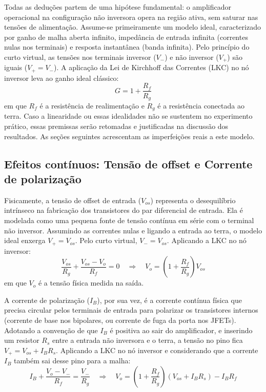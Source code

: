 \documentclass[11pt,a4paper]{article}
\begin{document}
Todas as deduções partem de uma hipótese fundamental: o amplificador operacional na configuração não inversora opera na região ativa, sem saturar nas tensões de alimentação. Assume-se primeiramente um modelo ideal, caracterizado por ganho de malha aberta infinito, impedância de entrada infinita (correntes nulas nos terminais) e resposta instantânea (banda infinita). Pelo princípio do curto virtual, as tensões nos terminais inversor ($V_-$) e não inversor ($V_+$) são iguais ($V_+ = V_-$). A aplicação da Lei de Kirchhoff das Correntes (LKC) no nó inversor leva ao ganho ideal clássico:
\begin{equation}
G = 1 + \frac{R_f}{R_g}
\label{eq:ganho_ni}
\end{equation}
em que $R_f$ é a resistência de realimentação e $R_g$ é a resistência conectada ao terra. Caso a linearidade ou essas idealidades não se sustentem no experimento prático, essas premissas serão retomadas e justificadas na discussão dos resultados. As seções seguintes acrescentam as imperfeições reais a este modelo.

\subsection{Efeitos contínuos: Tensão de offset e Corrente de polarização}

Fisicamente, a tensão de offset de entrada ($V_{os}$) representa o desequilíbrio intrínseco na fabricação dos transistores do par diferencial de entrada. Ela é modelada como uma pequena fonte de tensão contínua em série com o terminal não inversor. Assumindo as correntes nulas e ligando a entrada ao terra, o modelo ideal enxerga $V_+ = V_{os}$. Pelo curto virtual, $V_- = V_{os}$. Aplicando a LKC no nó inversor:
\begin{equation}
\frac{V_{os}}{R_g} + \frac{V_{os} - V_o}{R_f} = 0 \quad\Rightarrow\quad V_o = \left(1 + \frac{R_f}{R_g}\right)V_{os}
\label{eq:vos}
\end{equation}
em que $V_o$ é a tensão física medida na saída. 

A corrente de polarização ($I_B$), por sua vez, é a corrente contínua física que precisa circular pelos terminais de entrada para polarizar os transistores internos (corrente de base nos bipolares, ou corrente de fuga da porta nos JFETs). Adotando a convenção de que $I_B$ é positiva ao sair do amplificador, e inserindo um resistor $R_s$ entre a entrada não inversora e o terra, a tensão no pino fica $V_+ = V_{os} + I_BR_s$. Aplicando a LKC no nó inversor e considerando que a corrente $I_B$ também sai desse pino para a malha:
\begin{equation}
I_B + \frac{V_o - V_-}{R_f} = \frac{V_-}{R_g} 
\quad\Rightarrow\quad 
V_o = \left(1 + \frac{R_f}{R_g}\right)(V_{os} + I_BR_s) - I_BR_f
\label{eq:vo_rs}
\end{equation}
\end{document}
